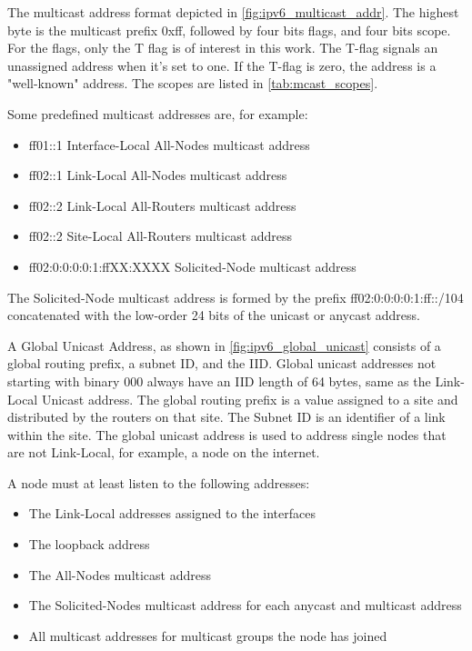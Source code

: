 The multicast address format depicted in \autoref{fig:ipv6_multicast_addr}.
The highest byte is the multicast prefix 0xff, followed by four bits flags, and four bits scope.
For the flags, only the T flag is of interest in this work.
The T-flag signals an unassigned address when it's set to one.
If the T-flag is zero, the address is a "well-known" address.
The scopes are listed in \autoref{tab:mcast_scopes}.

\newpage

Some predefined multicast addresses are, for example:
\begin{itemize}
	\item ff01::1 Interface-Local All-Nodes multicast address
	\item ff02::1 Link-Local All-Nodes multicast address
	\item ff02::2 Link-Local All-Routers multicast address
	\item ff02::2 Site-Local All-Routers multicast address
	\item ff02:0:0:0:0:1:ffXX:XXXX Solicited-Node multicast address
\end{itemize}
The Solicited-Node multicast address is formed by the prefix ff02:0:0:0:0:1:ff::/104 concatenated with the low-order 24 bits of the unicast or anycast address.



A Global Unicast Address, as shown in \autoref{fig:ipv6_global_unicast} consists of a global routing prefix, a subnet ID, and the IID.
Global unicast addresses not starting with binary 000 always have an IID length of 64 bytes, same as the Link-Local Unicast address.
The global routing prefix is a value assigned to a site and distributed by the routers on that site.
The Subnet ID is an identifier of a link within the site.
The global unicast address is used to address single nodes that are not Link-Local, for example, a node on the internet.

A node must at least listen to the following addresses:
\begin{itemize}
	\item The Link-Local addresses assigned to the interfaces
	\item The loopback address
	\item The All-Nodes multicast address
	\item The Solicited-Nodes multicast address for each anycast and multicast address
	\item All multicast addresses for multicast groups the node has joined
\end{itemize}

